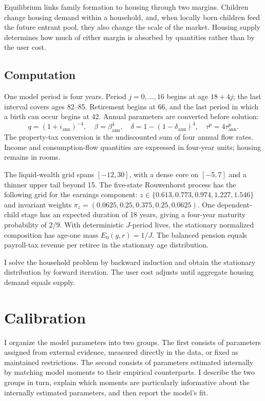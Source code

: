 \documentclass[11pt]{article}
\theoremstyle{definition}
\newcommand{\1}{\mathbf 1}
\begin{document}
Equilibrium links family formation to housing through two margins. Children
change housing demand within a household, and, when locally born children feed
the future entrant pool, they also change the scale of the market. Housing
supply determines how much of either margin is absorbed by quantities rather
than by the user cost.

\subsection{Computation}
\label{sec:quant_computation}

One model period is four years. Period $j=0,\ldots,16$ begins at age
$18+4j$; the last interval covers ages 82--85. Retirement begins at 66, and
the last period in which a birth can occur begins at 42. Annual parameters are
converted before solution:
\[
q=(1+i_{\mathrm{ann}})^{-4},
\quad
\beta=\beta_{\mathrm{ann}}^4,
\quad
\delta=1-(1-\delta_{\mathrm{ann}})^4,
\quad
\tau^p=4\tau^p_{\mathrm{ann}}.
\]
The property-tax conversion is the undiscounted sum of four annual flow rates.
Income and consumption-flow quantities are expressed in four-year units;
housing remains in rooms.

The liquid-wealth grid spans $[-12,30]$, with a dense core on
$[-5,7]$ and a thinner upper tail beyond 15. The five-state Rouwenhorst
process has the following grid for the earnings component:
$z\in\{0.613,0.773,0.974,1.227,1.546\}$ and invariant weights
$\pi_z=(0.0625,0.25,0.375,0.25,0.0625)$. One dependent-child stage has an expected
duration of 18 years, giving a four-year maturity probability of $2/9$.
With deterministic $J$-period lives, the stationary normalized composition has age-one mass $E_0(g,r)=1/J$. The balanced pension equals payroll-tax
revenue per retiree in the stationary age distribution.

I solve the household problem by backward induction and obtain the stationary
distribution by forward iteration. The user cost adjusts until aggregate
housing demand equals supply.

\section{Calibration}
\label{sec:quant_calibration}

I organize the model parameters into two groups. The first consists of
parameters assigned from external evidence, measured directly in the data, or
fixed as maintained restrictions. The second consists of parameters estimated
internally by matching model moments to their empirical counterparts. I describe
the two groups in turn, explain which moments are particularly informative
about the internally estimated parameters, and then report the model's fit.
\end{document}
